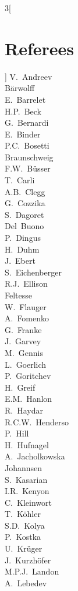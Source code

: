 \documentclass{llncs}
\begin{document}
\begin{multicols}{3}[\section*{Referees}]
V.~Andreev\\
B\"arwolff\\
E.~Barrelet\\
H.P.~Beck\\
G.~Bernardi\\
E.~Binder\\
P.C.~Bosetti\\
Braunschweig\\
F.W.~B\"usser\\
T.~Carli\\
A.B.~Clegg\\
G.~Cozzika\\
S.~Dagoret\\
Del~Buono\\
P.~Dingus\\
H.~Duhm\\
J.~Ebert\\
S.~Eichenberger\\
R.J.~Ellison\\
Feltesse\\
W.~Flauger\\
A.~Fomenko\\
G.~Franke\\
J.~Garvey\\
M.~Gennis\\
L.~Goerlich\\
P.~Goritchev\\
H.~Greif\\
E.M.~Hanlon\\
R.~Haydar\\
R.C.W.~Henderso\\
P.~Hill\\
H.~Hufnagel\\
A.~Jacholkowska\\
Johannsen\\
S.~Kasarian\\
I.R.~Kenyon\\
C.~Kleinwort\\
T.~K\"ohler\\
S.D.~Kolya\\
P.~Kostka\\
U.~Kr\"uger\\
J.~Kurzh\"ofer\\
M.P.J.~Landon\\
A.~Lebedev\\

\end{multicols}
\end{document}
